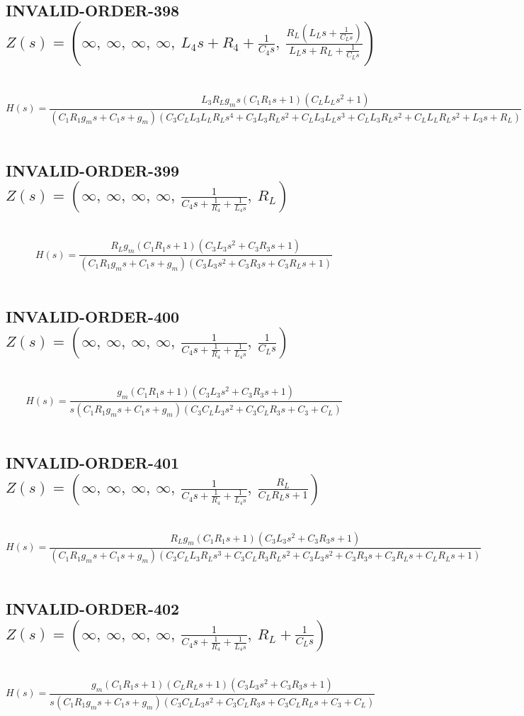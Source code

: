 \documentclass{article}
\begin{document}
\subsection{INVALID-ORDER-398 $Z(s) = \left( \infty, \  \infty, \  \infty, \  \infty, \  L_{4} s + R_{4} + \frac{1}{C_{4} s}, \  \frac{R_{L} \left(L_{L} s + \frac{1}{C_{L} s}\right)}{L_{L} s + R_{L} + \frac{1}{C_{L} s}}\right)$ } \ 
\textbf{\[H(s) = \frac{L_{3} R_{L} g_{m} s \left(C_{1} R_{1} s + 1\right) \left(C_{L} L_{L} s^{2} + 1\right)}{\left(C_{1} R_{1} g_{m} s + C_{1} s + g_{m}\right) \left(C_{3} C_{L} L_{3} L_{L} R_{L} s^{4} + C_{3} L_{3} R_{L} s^{2} + C_{L} L_{3} L_{L} s^{3} + C_{L} L_{3} R_{L} s^{2} + C_{L} L_{L} R_{L} s^{2} + L_{3} s + R_{L}\right)}\] } \ 
\subsection{INVALID-ORDER-399 $Z(s) = \left( \infty, \  \infty, \  \infty, \  \infty, \  \frac{1}{C_{4} s + \frac{1}{R_{4}} + \frac{1}{L_{4} s}}, \  R_{L}\right)$ } \ 
\textbf{\[H(s) = \frac{R_{L} g_{m} \left(C_{1} R_{1} s + 1\right) \left(C_{3} L_{3} s^{2} + C_{3} R_{3} s + 1\right)}{\left(C_{1} R_{1} g_{m} s + C_{1} s + g_{m}\right) \left(C_{3} L_{3} s^{2} + C_{3} R_{3} s + C_{3} R_{L} s + 1\right)}\] } \ 
\subsection{INVALID-ORDER-400 $Z(s) = \left( \infty, \  \infty, \  \infty, \  \infty, \  \frac{1}{C_{4} s + \frac{1}{R_{4}} + \frac{1}{L_{4} s}}, \  \frac{1}{C_{L} s}\right)$ } \ 
\textbf{\[H(s) = \frac{g_{m} \left(C_{1} R_{1} s + 1\right) \left(C_{3} L_{3} s^{2} + C_{3} R_{3} s + 1\right)}{s \left(C_{1} R_{1} g_{m} s + C_{1} s + g_{m}\right) \left(C_{3} C_{L} L_{3} s^{2} + C_{3} C_{L} R_{3} s + C_{3} + C_{L}\right)}\] } \ 
\subsection{INVALID-ORDER-401 $Z(s) = \left( \infty, \  \infty, \  \infty, \  \infty, \  \frac{1}{C_{4} s + \frac{1}{R_{4}} + \frac{1}{L_{4} s}}, \  \frac{R_{L}}{C_{L} R_{L} s + 1}\right)$ } \ 
\textbf{\[H(s) = \frac{R_{L} g_{m} \left(C_{1} R_{1} s + 1\right) \left(C_{3} L_{3} s^{2} + C_{3} R_{3} s + 1\right)}{\left(C_{1} R_{1} g_{m} s + C_{1} s + g_{m}\right) \left(C_{3} C_{L} L_{3} R_{L} s^{3} + C_{3} C_{L} R_{3} R_{L} s^{2} + C_{3} L_{3} s^{2} + C_{3} R_{3} s + C_{3} R_{L} s + C_{L} R_{L} s + 1\right)}\] } \ 
\subsection{INVALID-ORDER-402 $Z(s) = \left( \infty, \  \infty, \  \infty, \  \infty, \  \frac{1}{C_{4} s + \frac{1}{R_{4}} + \frac{1}{L_{4} s}}, \  R_{L} + \frac{1}{C_{L} s}\right)$ } \ 
\textbf{\[H(s) = \frac{g_{m} \left(C_{1} R_{1} s + 1\right) \left(C_{L} R_{L} s + 1\right) \left(C_{3} L_{3} s^{2} + C_{3} R_{3} s + 1\right)}{s \left(C_{1} R_{1} g_{m} s + C_{1} s + g_{m}\right) \left(C_{3} C_{L} L_{3} s^{2} + C_{3} C_{L} R_{3} s + C_{3} C_{L} R_{L} s + C_{3} + C_{L}\right)}\] } \ 
\end{document}
